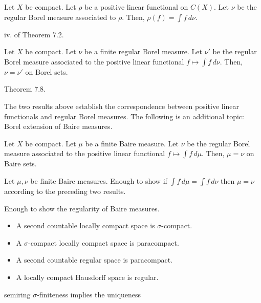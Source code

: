 \documentclass{../note}
\begin{document}
\begin{prb}
Let $X$ be compact.
Let $\rho$ be a positive linear functional on $C(X)$.
Let $\nu$ be the regular Borel measure associated to $\rho$.
Then, $\rho(f)=\int f\,d\nu$.
\end{prb}
\begin{sol}
iv. of Theorem 7.2.
\end{sol}

\begin{prb}
Let $X$ be compact.
Let $\nu$ be a finite regular Borel measure.
Let $\nu'$ be the regular Borel measure associated to the positive linear functional $f\mapsto\int f\,d\nu$.
Then, $\nu=\nu'$ on Borel sets.
\end{prb}
\begin{sol}
Theorem 7.8.
\end{sol}

The two results above establish the correspondence between positive linear functionals and regular Borel measures.
The following is an additional topic: Borel extension of Baire measures.
\begin{prb}
Let $X$ be compact.
Let $\mu$ be a finite Baire measure.
Let $\nu$ be the regular Borel measure associated to the positive linear functional $f\mapsto\int f\,d\mu$.
Then, $\mu=\nu$ on Baire sets.
\end{prb}
\begin{sol}
Let $\mu,\nu$ be finite Baire measures.
Enough to show if $\int f\,d\mu=\int f\,d\nu$ then $\mu=\nu$ according to the preceding two results.

Enough to show the regularity of Baire measures.
\end{sol}







\begin{itemize}
\item A second countable locally compact space is $\sigma$-compact.
\item A $\sigma$-compact locally compact space is paracompact.
\item A second countable regular space is paracompact.
\item A locally compact Hausdorff space is regular.
\end{itemize}

semiring
$\sigma$-finiteness implies the uniqueness
\end{document}
